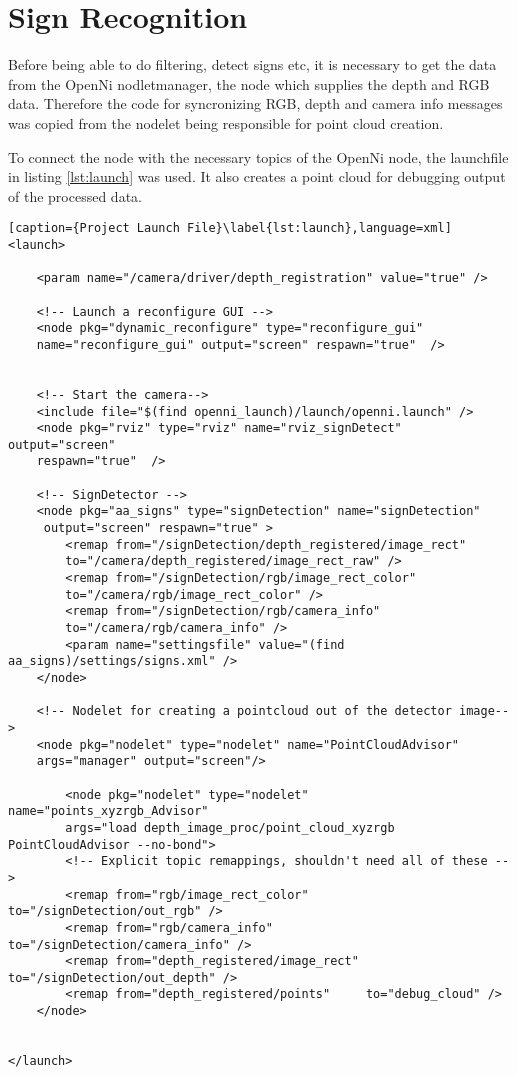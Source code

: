 \graphicspath{{./Software/img/}}
\chapter{Sign Recognition}
 
 Before being able to do filtering, detect signs etc, it is necessary to get the data from the OpenNi nodletmanager,
 the node which supplies the depth and RGB data. Therefore the code for syncronizing RGB, 
 depth and camera info messages was copied from the nodelet being responsible 
 for point cloud creation. 
 
To connect the node with the necessary topics of the OpenNi node, the launchfile in listing \vref{lst:launch}
was used. It also creates a point cloud for debugging output of the processed data.

\begin{lstlisting}[caption={Project Launch File}\label{lst:launch},language=xml]
<launch>

	<param name="/camera/driver/depth_registration" value="true" />	

	<!-- Launch a reconfigure GUI -->
	<node pkg="dynamic_reconfigure" type="reconfigure_gui" 
	name="reconfigure_gui" output="screen" respawn="true"  />
	
	
	<!-- Start the camera-->
	<include file="$(find openni_launch)/launch/openni.launch" />
	<node pkg="rviz" type="rviz" name="rviz_signDetect" output="screen" 
	respawn="true"  />

	<!-- SignDetector -->
	<node pkg="aa_signs" type="signDetection" name="signDetection" 
	 output="screen" respawn="true" > 
 		<remap from="/signDetection/depth_registered/image_rect" 	
 		to="/camera/depth_registered/image_rect_raw" />
 		<remap from="/signDetection/rgb/image_rect_color" 			
 		to="/camera/rgb/image_rect_color" />
 		<remap from="/signDetection/rgb/camera_info" 				
 		to="/camera/rgb/camera_info" />
 		<param name="settingsfile" value="(find aa_signs)/settings/signs.xml" />
	</node>

  	<!-- Nodelet for creating a pointcloud out of the detector image-->
	<node pkg="nodelet" type="nodelet" name="PointCloudAdvisor" 
	args="manager" output="screen"/>

		<node pkg="nodelet" type="nodelet" name="points_xyzrgb_Advisor" 
		args="load depth_image_proc/point_cloud_xyzrgb PointCloudAdvisor --no-bond">
	    <!-- Explicit topic remappings, shouldn't need all of these -->
	    <remap from="rgb/image_rect_color"        to="/signDetection/out_rgb" />
	    <remap from="rgb/camera_info"             to="/signDetection/camera_info" />
	    <remap from="depth_registered/image_rect" to="/signDetection/out_depth" />
	    <remap from="depth_registered/points"     to="debug_cloud" />
  	</node>
  	
  	
</launch>
\end{lstlisting}

